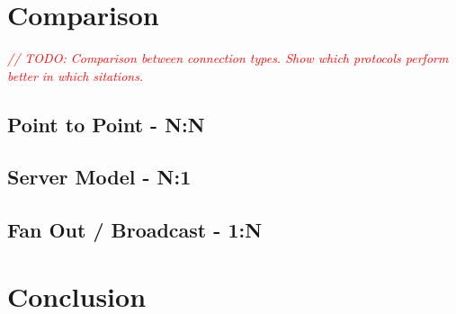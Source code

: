 \documentclass{article}
\newcommand{\todo}[1]{\textit{\textcolor{red}{// TODO: #1} }}
\theoremstyle{plain}
\theoremstyle{definition}
\theoremstyle{remark}
\begin{document}
\pagebreak
\section{Comparison}
\todo{Comparison between connection types. Show which protocols perform better in which sitations.}

\subsection{Point to Point - N:N}

\subsection{Server Model - N:1}

\subsection{Fan Out / Broadcast - 1:N}

\pagebreak
\section{Conclusion}



\pagebreak


{}
\end{document}
